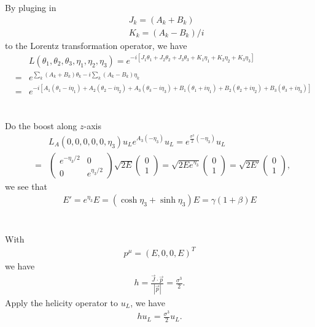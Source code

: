 \documentclass[11pt]{article}
\begin{document}
\section{ }
By pluging in
\begin{eqnarray}
    && J_k = (A_k + B_k) \\
    && K_k = (A_k - B_k)/i
\end{eqnarray}
to the Lorentz transformation operator, we have
\begin{eqnarray}
    &&L(\theta_1, \theta_2, \theta_3, \eta_1, \eta_2, \eta_3)
  =  e^{-i[ J_1\theta_1 +J_2\theta_2 +J_3\theta_3 +K_1\eta_1 +K_2\eta_2 +K_3\eta_3 ]} \\
  &=&e^{\sum_k(A_k+B_k)\theta_k -i\sum_k(A_k-B_k)\eta_k} \\
  &=& e^{-i[ A_1(\theta_1-i\eta_1) +A_2(\theta_2-i\eta_2) +A_3(\theta_3-i\eta_3)
          +B_1(\theta_1+i\eta_1) +B_2(\theta_2+i\eta_2) +B_3(\theta_3+i\eta_3) ]} 
\end{eqnarray}

\section{ }
Do the boost along $z$-axis
\begin{eqnarray}
   && L_A(0,0,0,0,0,\eta_3) u_L
    e^{ A_3       (-\eta_3) } u_L
    = e^{ \frac{\sigma^3}{2} (-\eta_3) }u_L \\
    &=&
    \begin{pmatrix}
      e^{-\eta_3/2} & 0 \\
      0 & e^{\eta_3/2}
    \end{pmatrix} 
    \sqrt{2E}
    \begin{pmatrix}
        0 \\ 1
    \end{pmatrix}
    =\sqrt{2E e^{\eta_3}}
    \begin{pmatrix}
        0 \\ 1
    \end{pmatrix}
    =\sqrt{2E'}
    \begin{pmatrix}
        0 \\ 1
    \end{pmatrix},
\end{eqnarray}
we see that
\begin{eqnarray}
    E' = e^{\eta_3} E = (\cosh\eta_3 + \sinh\eta_3) E = \gamma(1+\beta) E 
\end{eqnarray}

\section{ }
With
\begin{eqnarray}
    p^\mu = (E, 0, 0, E)^T 
\end{eqnarray}
we have
\begin{eqnarray}
    h=\frac{\vec{J} \cdot {\vec p}}{|\vec{p}|}=\frac{\sigma^3}{2}.
\end{eqnarray}
Apply the helicity operator to $u_L$, we have
\begin{eqnarray}
    h u_L=\frac{\sigma^3}{2} u_L.
\end{eqnarray}
\end{document}
